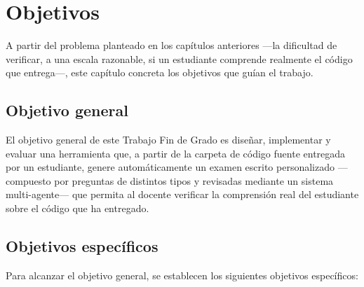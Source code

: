 \chapter{Objetivos}
\label{cap:objetivos}

A partir del problema planteado en los capítulos anteriores ---la dificultad de
verificar, a una escala razonable, si un estudiante comprende realmente el
código que entrega---, este capítulo concreta los objetivos que guían el
trabajo.


\section{Objetivo general}
\label{sec:objetivo-general}

El objetivo general de este Trabajo Fin de Grado es diseñar, implementar y
evaluar una herramienta que, a partir de la carpeta de código fuente
entregada por un estudiante, genere automáticamente un examen escrito
personalizado ---compuesto por preguntas de distintos tipos y revisadas
mediante un sistema multi-agente--- que permita al docente verificar la
comprensión real del estudiante sobre el código que ha entregado.


\section{Objetivos específicos}
\label{sec:objetivos-especificos}

Para alcanzar el objetivo general, se establecen los siguientes objetivos
específicos:

